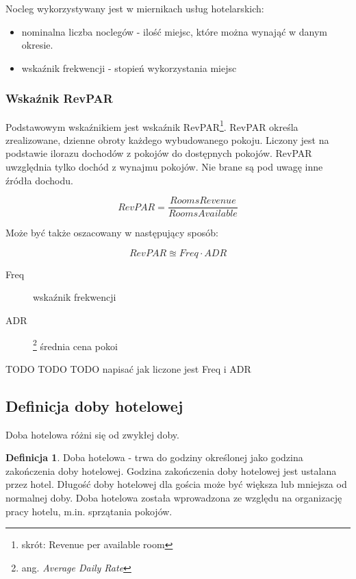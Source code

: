 \documentclass[a4paper,onecolumn,oneside,11pt,wide,floatssmall]{mwrep}
\theoremstyle{definition}
\newtheorem{defn}{Definicja}[section]
\theoremstyle{plain}%
\theoremstyle{remark}
\begin{document}
Nocleg wykorzystywany jest w miernikach usług hotelarskich:
\begin{itemize}
  \item nominalna liczba noclegów - ilość miejsc, które można wynająć w 
  danym okresie.
  \item wskaźnik frekwencji - stopień wykorzystania miejsc
\end{itemize}

\subsubsection{Wskaźnik RevPAR}
Podstawowym wskaźnikiem jest wskaźnik RevPAR\footnote{skrót: Revenue per 
available room}. RevPAR określa zrealizowane, 
dzienne obroty każdego wybudowanego pokoju. Liczony jest na podstawie
 ilorazu dochodów z pokojów do dostępnych pokojów. RevPAR uwzględnia tylko 
 dochód z wynajmu pokojów. Nie brane są pod uwagę inne źródła dochodu.

\begin{equation}
RevPAR = \frac{Rooms Revenue}{Rooms Available}
\end{equation}

Może być także oszacowany w następujący sposób:

\begin{equation}
RevPAR \approxeq Freq \cdot ADR
\end{equation}

\begin{description}
  \item[Freq] wskaźnik frekwencji
  \item[ADR]\footnote{ang. {\em Average Daily Rate} } średnia cena pokoi

\end{description}

TODO TODO TODO napisać jak liczone jest Freq i ADR

\subsection{Definicja doby hotelowej}
Doba hotelowa różni się od zwykłej doby.

\begin{defn}{Doba hotelowa} - trwa do godziny określonej jako godzina 
zakończenia doby 
hotelowej. Godzina zakończenia doby hotelowej jest ustalana przez hotel.
 Długość doby hotelowej dla gościa może być większa lub mniejsza 
od normalnej doby. Doba hotelowa została wprowadzona ze względu na 
organizację pracy hotelu, m.in. sprzątania pokojów.

\end{defn}
\end{document}
